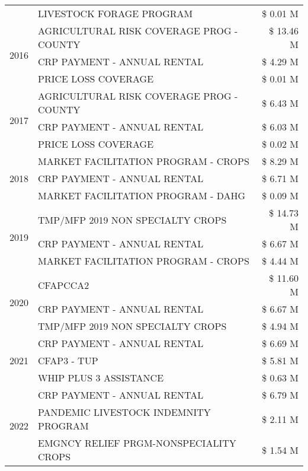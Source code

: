 \begin{tabular}{llr}
 & LIVESTOCK FORAGE PROGRAM & \$ 0.01 M \\
\cline{1-3}
\multirow[t]{3}{*}{2016} & AGRICULTURAL RISK COVERAGE PROG - COUNTY & \$ 13.46 M \\
 & CRP PAYMENT - ANNUAL RENTAL & \$ 4.29 M \\
 & PRICE LOSS COVERAGE & \$ 0.01 M \\
\cline{1-3}
\multirow[t]{3}{*}{2017} & AGRICULTURAL RISK COVERAGE PROG - COUNTY & \$ 6.43 M \\
 & CRP PAYMENT - ANNUAL RENTAL & \$ 6.03 M \\
 & PRICE LOSS COVERAGE & \$ 0.02 M \\
\cline{1-3}
\multirow[t]{3}{*}{2018} & MARKET FACILITATION PROGRAM - CROPS & \$ 8.29 M \\
 & CRP PAYMENT - ANNUAL RENTAL & \$ 6.71 M \\
 & MARKET FACILITATION PROGRAM - DAHG & \$ 0.09 M \\
\cline{1-3}
\multirow[t]{3}{*}{2019} & TMP/MFP 2019 NON SPECIALTY CROPS & \$ 14.73 M \\
 & CRP PAYMENT - ANNUAL RENTAL & \$ 6.67 M \\
 & MARKET FACILITATION PROGRAM - CROPS & \$ 4.44 M \\
\cline{1-3}
\multirow[t]{3}{*}{2020} & CFAPCCA2 & \$ 11.60 M \\
 & CRP PAYMENT - ANNUAL RENTAL & \$ 6.67 M \\
 & TMP/MFP 2019 NON SPECIALTY CROPS & \$ 4.94 M \\
\cline{1-3}
\multirow[t]{3}{*}{2021} & CRP PAYMENT - ANNUAL RENTAL & \$ 6.69 M \\
 & CFAP3 - TUP & \$ 5.81 M \\
 & WHIP PLUS 3 ASSISTANCE & \$ 0.63 M \\
\cline{1-3}
\multirow[t]{3}{*}{2022} & CRP PAYMENT - ANNUAL RENTAL & \$ 6.79 M \\
 & PANDEMIC LIVESTOCK INDEMNITY PROGRAM & \$ 2.11 M \\
 & EMGNCY RELIEF PRGM-NONSPECIALITY CROPS & \$ 1.54 M \\
\cline{1-3}
\bottomrule
\end{tabular}
